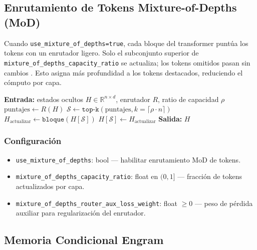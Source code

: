 \subsection{Enrutamiento de Tokens Mixture-of-Depths (MoD)}

Cuando \texttt{use\_mixture\_of\_depths=true}, cada bloque del transformer puntúa los tokens con un enrutador ligero. Solo el subconjunto superior de \texttt{mixture\_of\_depths\_capacity\_ratio} se actualiza; los tokens omitidos pasan sin cambios \citep{zhu2026mixtureofdepthsattention}. Esto asigna más profundidad a los tokens destacados, reduciendo el cómputo por capa.

\begin{algorithmic}[1]
\State \textbf{Entrada:} estados ocultos $H \in \mathbb{R}^{n \times d}$, enrutador $R$, ratio de capacidad $\rho$
\State $\text{puntajes} \gets R(H)$ 
\State $\mathcal{S} \gets \texttt{top-k}(\text{puntajes}, k=\lceil \rho \cdot n \rceil)$ 
\State $H_{\text{actualizar}} \gets \texttt{bloque}(H[\mathcal{S}])$ 
\State $H[\mathcal{S}] \gets H_{\text{actualizar}}$ 
\State \textbf{Salida:} $H$ 
\end{algorithmic}

\subsubsection{Configuración}
\begin{itemize}[leftmargin=*]
    \item \texttt{use\_mixture\_of\_depths}: bool --- habilitar enrutamiento MoD de tokens.
    \item \texttt{mixture\_of\_depths\_capacity\_ratio}: float en $(0, 1]$ --- fracción de tokens actualizados por capa.
    \item \texttt{mixture\_of\_depths\_router\_aux\_loss\_weight}: float $\ge 0$ --- peso de pérdida auxiliar para regularización del enrutador.
\end{itemize}

\subsection{Memoria Condicional Engram}

